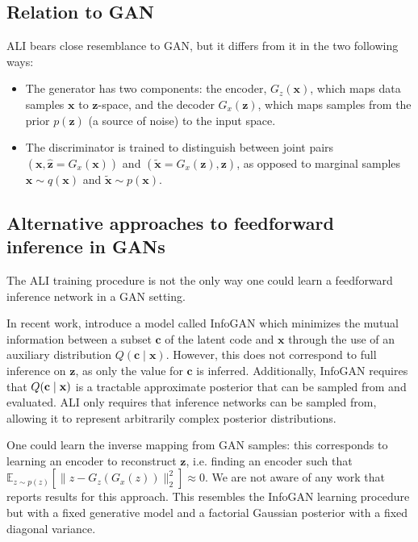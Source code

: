 \documentclass{article}
\begin{document}
\subsection{Relation to GAN}
ALI bears close resemblance to GAN, but it differs from it in the two following
ways:

\begin{itemize}
	\item The generator has two components: the encoder, $G_z(\bm{x})$, which
		maps data samples $\bm{x}$ to $\bm{z}$-space, and the decoder
		$G_x(\bm{z})$, which maps samples from the prior $p(\bm{z})$ (a source
		of noise) to the input space.
	\item The discriminator is trained to distinguish between joint pairs
		$(\bm{x}, \hat{\bm{z}} = G_x(\bm{x}))$ and $(\tilde{\bm{x}} =
		G_x(\bm{z}), \bm{z})$, as opposed to marginal samples $\bm{x} \sim
		q(\bm{x})$ and $\tilde{\bm{x}} \sim p(\bm{x})$.
\end{itemize}

\subsection{Alternative approaches to feedforward inference in GANs}
\label{sec:alternative}

The ALI training procedure is not the only way one could learn a feedforward
inference network in a GAN setting.

In recent work, \citet{chen2016infogan} introduce a model called InfoGAN which
minimizes the mutual information between a subset $\bm{c}$ of the latent code
and $\bm{x}$ through the use of an auxiliary distribution $Q(\bm{c} \mid
\bm{x})$. However, this does not correspond to full inference on $\bm{z}$, as
only the value for $\bm{c}$ is inferred. Additionally, InfoGAN requires that
$Q(\bf{c} \mid \bf{x})$ is a tractable approximate posterior that can be sampled
from and evaluated. ALI only requires that inference networks can be sampled
from, allowing it to represent arbitrarily complex posterior distributions.

One could learn the inverse mapping from GAN samples: this corresponds to
learning an encoder to reconstruct $\bm{z}$, i.e. finding an encoder such that
$\mathbb{E}_{z \sim p(z)}[\|z - G_z(G_x(z))\|_2^2] \approx 0$. We are not aware
of any work that reports results for this approach. This resembles the InfoGAN
learning procedure but with a fixed generative model and a factorial Gaussian
posterior with a fixed diagonal variance.
\end{document}

